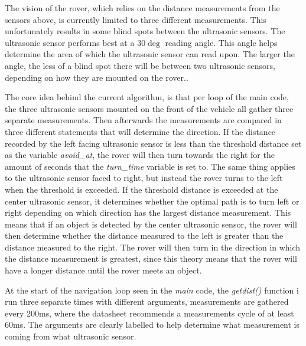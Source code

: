 
The vision of the rover, which relies on the distance measurements from the sensors above, is currently limited to three different measurements. This unfortunately results in some blind spots between the ultrasonic sensors.
The ultrasonic sensor performs best at a $30\deg$ reading angle. This angle helps determine the area of which the ultrasonic sensor can read upon. The larger the angle, the less of a blind spot there will be between two ultrasonic sensors, depending on how they are mounted on the rover.\cite{hcsr40datesheet}.

\clearpage


The core idea behind the current algorithm, is that per loop of the main code, the three ultrasonic sensors mounted on the front of the vehicle all gather three separate measurements. Then afterwards the measurements are compared in three different statements that will determine the direction. If the distance recorded by the left facing ultrasonic sensor is less than the threshold distance set as the variable \textit{avoid\_at}, the rover will then turn towards the right for the amount of seconds that the \textit{turn\_time} variable is set to. The same thing applies to the ultrasonic sensor faced to right, but instead the rover turns to the left when the threshold is exceeded.
If the threshold distance is exceeded at the center ultrasonic sensor, it determines whether the optimal path is to turn left or right depending on which direction has the largest distance measurement. This means that if an object is detected by the center ultrasonic sensor, the rover will then determine whether the distance measured to the left is greater than the distance measured to the right. The rover will then turn in the direction in which the distance measurement is greatest, since this theory means that the rover will have a longer distance until the rover meets an object.

\clearpage


At the start of the navigation loop seen in the \textit{main} code, the \textit{getdist()} function i run three separate times with different arguments, measurements are gathered every 200ms, where the datasheet recommends a measurements cycle of at least 60ms. The arguments are clearly labelled to help determine what measurement is coming from what ultrasonic sensor.
